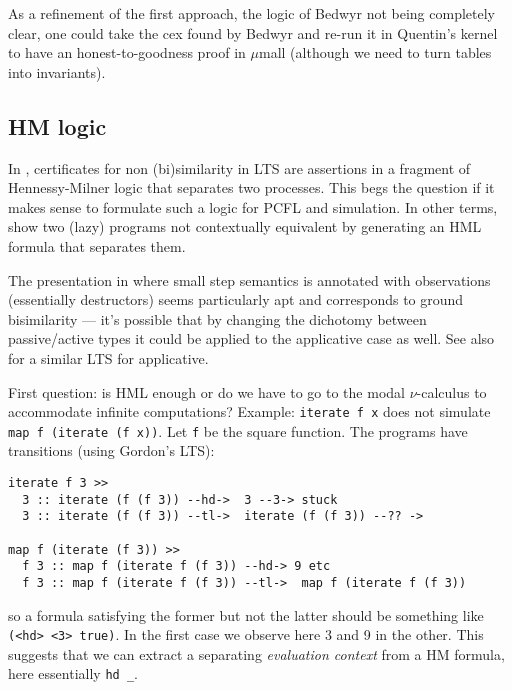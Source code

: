 \documentclass[sigconf]{acmart}
\begin{document}
As a refinement of the first approach, the logic of Bedwyr not being
completely clear, one could take the cex found by Bedwyr and re-run it
in Quentin's kernel to have an honest-to-goodness proof in $\mu$mall
(although we need to turn tables into invariants).

 
\subsection{HM logic}
\label{sec:hml}
In \cite{HeathM15}, certificates for non (bi)similarity in LTS are assertions
in a fragment of Hennessy-Milner logic that separates two
processes. This begs the question if it makes sense to formulate such
a logic for PCFL and simulation. In other terms, show two (lazy) programs not contextually equivalent by generating an HML formula that separates them.

The presentation in \cite{Gordon95}
where small step semantics is annotated with observations (essentially
destructors) seems particularly apt and corresponds to ground
bisimilarity --- it's possible that by changing the dichotomy between
passive/active types it could be applied to the applicative case as
well.  See also\cite{LagoR15} for a similar LTS for applicative.

First question: is HML enough or do we have to go to the modal $\nu$-calculus to accommodate infinite computations? Example: \texttt{iterate f x} does not simulate
\texttt{map f (iterate (f x))}. Let \texttt{f} be the square function. The programs have transitions (using Gordon's LTS):
\begin{lstlisting}
iterate f 3 >> 
  3 :: iterate (f (f 3)) --hd->  3 --3-> stuck 
  3 :: iterate (f (f 3)) --tl->  iterate (f (f 3)) --?? ->

map f (iterate (f 3)) >>
  f 3 :: map f (iterate f (f 3)) --hd-> 9 etc
  f 3 :: map f (iterate f (f 3)) --tl->  map f (iterate f (f 3))
\end{lstlisting}
so a formula satisfying the former but not the latter should be something like
\texttt{(<hd> <3> true)}. In the first case we observe here 3 and  9 in the other. This suggests that we
can extract a separating \emph{evaluation context} from a HM formula, here essentially \texttt{hd \_}.
\end{document}
